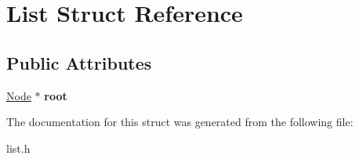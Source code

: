 \hypertarget{structList}{\section{List Struct Reference}
\label{structList}
}
\subsection*{Public Attributes}
\begin{DoxyCompactItemize}
\item 
\hypertarget{structList_a9e2f05e80bc835fdaaedb0cd698fc5c8}{\hyperlink{structNode}{Node} $\ast$ {\bfseries root}}\label{structList_a9e2f05e80bc835fdaaedb0cd698fc5c8}

\end{DoxyCompactItemize}


The documentation for this struct was generated from the following file\-:\begin{DoxyCompactItemize}
\item 
list.\-h\end{DoxyCompactItemize}

